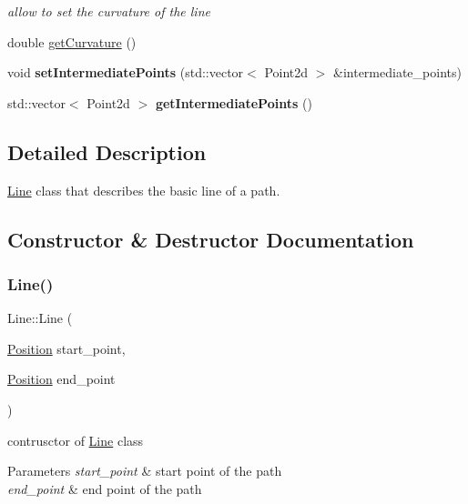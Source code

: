 \begin{DoxyCompactItemize}
\begin{DoxyCompactList}\small\item\em allow to set the curvature of the line \end{DoxyCompactList}\item 
double \mbox{\hyperlink{class_line_ac89d7d051ee5eedc03c65ea4169d94df}{get\+Curvature}} ()
\item 
\mbox{\label{class_line_a7b2e76513c026a0b2ed4b62c47027b67}} 
void {\bfseries set\+Intermediate\+Points} (std\+::vector$<$ Point2d $>$ \&intermediate\+\_\+points)
\item 
\mbox{\label{class_line_ad926240c4f5b2df1cc28a414af01e02c}} 
std\+::vector$<$ Point2d $>$ {\bfseries get\+Intermediate\+Points} ()
\end{DoxyCompactItemize}


\subsection{Detailed Description}
\mbox{\hyperlink{class_line}{Line}} class that describes the basic line of a path. 

\subsection{Constructor \& Destructor Documentation}
\mbox{\label{class_line_a123e1da8ef560bac5ab6b643e25c3d8f}} 
\subsubsection{\texorpdfstring{Line()}{Line()}}
{\footnotesize\ttfamily Line\+::\+Line (\begin{DoxyParamCaption}\item[{\mbox{\hyperlink{class_position}{Position}}}]{start\+\_\+point,  }\item[{\mbox{\hyperlink{class_position}{Position}}}]{end\+\_\+point }\end{DoxyParamCaption})}



contrusctor of \mbox{\hyperlink{class_line}{Line}} class 


\begin{DoxyParams}{Parameters}
{\em start\+\_\+point} & start point of the path \\
\hline
{\em end\+\_\+point} & end point of the path \\
\hline
\end{DoxyParams}


